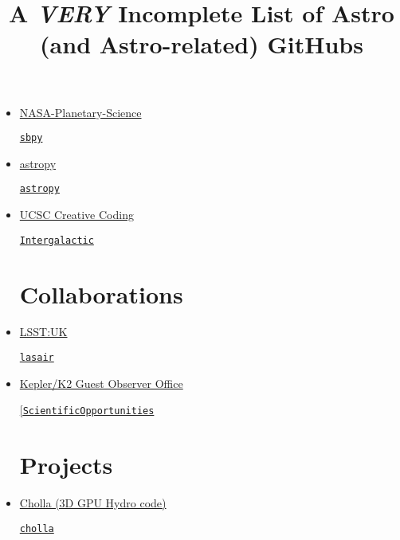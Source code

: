 \documentclass[11pt,a4paper]{article}
\begin{document}
\title{A {\it VERY} Incomplete List of Astro (and Astro-related) GitHubs}
\maketitle



\begin{itemize}


\section*{Organisations}  

\item \href{https://github.com/NASA-Planetary-Science}{NASA-Planetary-Science}
  \begin{itemize}
    \href{https://github.com/NASA-Planetary-Science/sbpy}{{\tt sbpy}}
  \end{itemize}
  
\item \href{https://github.com/astropy}{astropy}
  \begin{itemize}
    \href{https://github.com/astropy/astropy}{{\tt astropy}}
  \end{itemize}

\item \href{https://github.com/CreativeCodingLab}{UCSC Creative Coding}
  \begin{itemize}
    \href{https://github.com/CreativeCodingLab/Intergalactic}{{\tt Intergalactic}}
  \end{itemize}



\section*{Collaborations}  
\item \href{https://github.com/lsst-uk}{LSST:UK}
  \begin{itemize}
    \href{https://github.com/lsst-uk/lasair/}{{\tt lasair}}
  \end{itemize}

\item \href{https://github.com/KeplerGO/}{Kepler/K2 Guest Observer Office}
  \begin{itemize}
    \href{https://github.com/KeplerGO/ScientificOpportunities}{[\tt ScientificOpportunities}
  \end{itemize}
  

\section*{Projects}  
\item \href{https://github.com/cholla-hydro}{Cholla (3D GPU Hydro code)}
  \begin{itemize}
    \href{https://github.com/cholla-hydro/cholla}{{\tt cholla}}
  \end{itemize}
 


\end{itemize}
\end{document}
